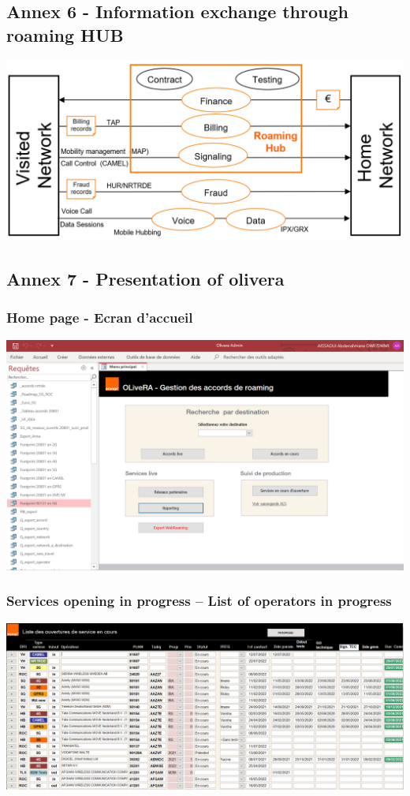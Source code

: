 \subsection*{Annex 6 - Information exchange through roaming HUB}
\begin{center}
\includegraphics[scale=0.71]{annexs/roaming relation via hub.PNG}
\end{center}

\subsection*{Annex 7 - Presentation of olivera}
\subsubsection*{Home page - Ecran d’accueil}
\begin{center}
\includegraphics[scale=0.5]{annexs/Olivera 1ST.PNG}
\end{center}

\subsubsection*{Services opening in progress – List of operators in progress}
\begin{center}
\includegraphics[scale=0.45]{annexs/oliv 3.PNG}
\end{center}

